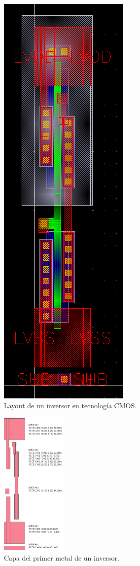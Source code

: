 \documentclass[reprint,amsmath,amssymb,aps]{revtex4-2}
\begin{document}
\begin{figure}[H]
	\centering
	\includegraphics[scale=0.65]{inv.png}
	\caption{Layout de un inversor en tecnología CMOS.}
	\label{inv}
\end{figure}

\begin{figure}[H]
	\centering
	\includegraphics[width=0.29\textwidth]{inv_m1.pdf}
	\caption{Capa del primer metal de un inversor.}
	\label{inv_m1}
\end{figure}
\end{document}

